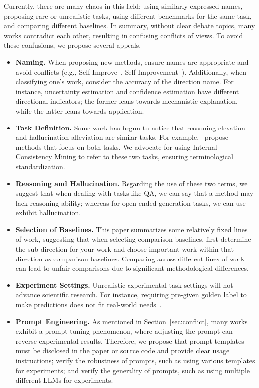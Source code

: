 \documentclass[lettersize,journal]{IEEEtran}
\begin{document}
\noindent Currently, there are many chaos in this field: using similarly expressed names, proposing rare or unrealistic tasks, using different benchmarks for the same task, and comparing different baselines. In summary, without clear debate topics, many works contradict each other, resulting in confusing conflicts of views. To avoid these confusions, we propose several appeals.

\begin{itemize}
    \item \textbf{Naming.} When proposing new methods, ensure names are appropriate and avoid conflicts (e.g., Self-Improve~\cite{SelfImprove_23_EMNLP_Illinois}, Self-Improvement~\cite{SelfImprovement_24_arXiv_Tencent}). Additionally, when classifying one's work, consider the accuracy of the direction name. For instance, uncertainty estimation and confidence estimation have different directional indicators; the former leans towards mechanistic explanation, while the latter leans towards application.

    \item \textbf{Task Definition.} Some work has begun to notice that reasoning elevation and hallucination alleviation are similar tasks. For example,~\cite{MAF_23_EMNLP_UCSB, SelfBias_24_arXiv_UCSB} propose methods that focus on both tasks. We advocate for using Internal Consistency Mining to refer to these two tasks, ensuring terminological standardization.

    \item \textbf{Reasoning and Hallucination.} Regarding the use of these two terms, we suggest that when dealing with tasks like QA, we can say that a method may lack reasoning ability; whereas for open-ended generation tasks, we can use exhibit hallucination.
    
    \item \textbf{Selection of Baselines.} This paper summarizes some relatively fixed lines of work, suggesting that when selecting comparison baselines, first determine the sub-direction for your work and choose important work within that direction as comparison baselines. Comparing across different lines of work can lead to unfair comparisons due to significant methodological differences.

    \item \textbf{Experiment Settings.} Unrealistic experimental task settings will not advance scientific research. For instance, requiring pre-given golden label to make predictions does not fit real-world needs~\cite{TheoryNoReason_24_ICLR_Google}.

    \item \textbf{Prompt Engineering.} As mentioned in Section~\ref{sec:conflict}, many works exhibit a prompt tuning phenomenon, where adjusting the prompt can reverse experimental results. Therefore, we propose that prompt templates must be disclosed in the paper or source code and provide clear usage instructions; verify the robustness of prompts, such as using various templates for experiments; and verify the generality of prompts, such as using multiple different LLMs for experiments.
\end{itemize}
\end{document}
